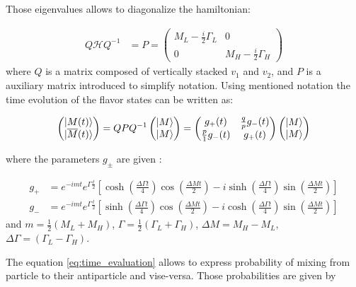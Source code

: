 Those eigenvalues allows to diagonalize the hamiltonian: 

\begin{align}
   Q\mathcal{H}Q^{-1} &= P =  \left( \begin{matrix} M_{L} - \frac{i}{2}\Gamma_{L} & 0  \\ 0 &  M_{H} - \frac{i}{2}\Gamma_{H}  \end{matrix} \right) 
\end{align}
where $Q$ is a matrix composed of vertically stacked $v_1$ and $v_2$, and $P$ is a auxiliary matrix introduced to simplify notation. 
Using mentioned notation the time evolution of the flavor states can be written as:

\begin{align}
\label{eq:time_evaluation}
  \left(\begin{matrix} \lvert M(t)\rangle  \\ \lvert\overline{M}(t)\rangle \end{matrix}  \right) 
  = QPQ^{-1} \left(\begin{matrix} \lvert M\rangle  \\ \lvert M\rangle \end{matrix}  \right) 
  = \left(\begin{matrix} g_{+}(t) &  \frac{q}{p}g_{-}(t)  \\  \frac{p}{1}g_{-}(t)  & g_{+}(t)  \end{matrix}\right) 
  \left(\begin{matrix} \lvert M\rangle  \\ \lvert M\rangle \end{matrix}  \right)   
\end{align}

where the parameters $g_{\pm}$ are given :

\begin{align}
    g_{+} &= e^{-imt}e^{\Gamma \frac{t}{2}} \left[ \cosh(\frac{\Delta \Gamma t}{4})\cos(\frac{\Delta M t}{2})  - i\sinh(\frac{\Delta \Gamma t}{4})\sin(\frac{\Delta M t}{2})  \right] \\ 
    g_{-} &= e^{-imt}e^{\Gamma \frac{t}{2}} \left[ \sinh(\frac{\Delta \Gamma t}{4})\cos(\frac{\Delta M t}{2})  - i\cosh(\frac{\Delta \Gamma t}{4})\sin(\frac{\Delta M t}{2})  \right]   
\end{align}
and $m = \frac{1}{2}(M_{L}+M_H)$, $\Gamma =  \frac{1}{2}(\Gamma_{L}+\Gamma_{H})$, $\Delta M = M_{H}- M_{L}$, $ \Delta \Gamma =(\Gamma_{L}-\Gamma_{H})$.

The equation \ref{eq:time_evaluation} allows to express probability of mixing from particle to their antiparticle and vise-versa. Those probabilities are given by 

